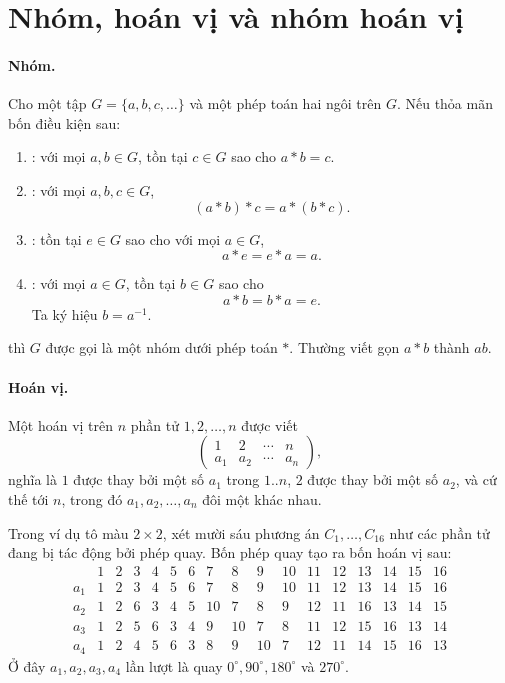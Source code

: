 \documentclass[11pt]{article}
\begin{document}
\section{Nhóm, hoán vị và nhóm hoán vị}

\paragraph{Nhóm.}
Cho một tập \(G=\{a,b,c,\ldots\}\) và một phép toán hai ngôi trên \(G\). Nếu
thỏa mãn bốn điều kiện sau:
\begin{enumerate}
  \item {}: với mọi \(a,b\in G\), tồn tại \(c\in G\) sao cho
  \(a*b=c\).
  \item {}: với mọi \(a,b,c\in G\),
  \[
    (a*b)*c=a*(b*c).
  \]
  \item {}: tồn tại \(e\in G\) sao cho với mọi \(a\in G\),
  \[
    a*e=e*a=a.
  \]
  \item {}: với mọi \(a\in G\), tồn tại \(b\in G\) sao
  cho
  \[
    a*b=b*a=e.
  \]
  Ta ký hiệu \(b=a^{-1}\).
\end{enumerate}
thì \(G\) được gọi là một nhóm dưới phép toán \(*\). Thường viết gọn \(a*b\)
thành \(ab\).

\paragraph{Hoán vị.}
Một hoán vị trên \(n\) phần tử \(1,2,\ldots,n\) được viết
\[
  \begin{pmatrix}
    1 & 2 & \cdots & n\\
    a_1 & a_2 & \cdots & a_n
  \end{pmatrix},
\]
nghĩa là \(1\) được thay bởi một số \(a_1\) trong \(1..n\), \(2\) được thay
bởi một số \(a_2\), và cứ thế tới \(n\), trong đó
\(a_1,a_2,\ldots,a_n\) đôi một khác nhau.

Trong ví dụ tô màu \(2\times2\), xét mười sáu phương án \(C_1,\ldots,C_{16}\)
như các phần tử đang bị tác động bởi phép quay. Bốn phép quay tạo ra bốn hoán
vị sau:
\[
\begin{array}{c|rrrrrrrrrrrrrrrr}
 &1&2&3&4&5&6&7&8&9&10&11&12&13&14&15&16\\ \hline
a_1&1&2&3&4&5&6&7&8&9&10&11&12&13&14&15&16\\
a_2&1&2&6&3&4&5&10&7&8&9&12&11&16&13&14&15\\
a_3&1&2&5&6&3&4&9&10&7&8&11&12&15&16&13&14\\
a_4&1&2&4&5&6&3&8&9&10&7&12&11&14&15&16&13
\end{array}
\]
Ở đây \(a_1,a_2,a_3,a_4\) lần lượt là quay \(0^\circ,90^\circ,180^\circ\)
và \(270^\circ\).
\end{document}
